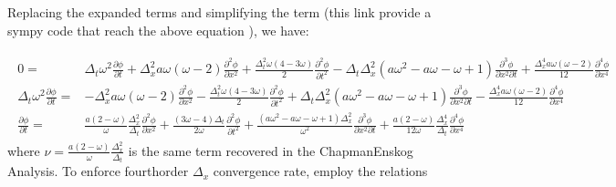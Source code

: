\documentclass[letterpaper,10pt,english,openany,oneside]{jupyterBook}
\begin{document}
\sphinxAtStartPar
Replacing the expanded terms and simplifying the term (this link provide a sympy code that reach the above equation ), we have:


\begin{equation}\label{equation:Refs/LBM-Study/FDM-Belloti/FDM-LBM-Diffusive:FDM-LBM-diff-replaced-expansions-phi}
\begin{split}
\begin{array}{rl}
0=&\Delta_{t} \omega^{2} \displaystyle\frac{\partial\phi}{\partial t} + \Delta_{x}^{2} a \omega \left(\omega - 2\right) \frac{\partial^{2}\phi}{\partial x^{2}}  + \frac{\Delta_{t}^{2} \omega \left(4 - 3 \omega\right) }{2} \frac{\partial^{2}\phi}{\partial t^{2}} - \Delta_{t} \Delta_{x}^{2} \left(a \omega^{2} - a \omega - \omega + 1\right) \frac{\partial^{3}\phi}{\partial x^{2}\partial t} + \frac{\Delta_{x}^{4} a \omega \left(\omega - 2\right) }{12}\frac{\partial^{4}\phi}{\partial x^{4}}\\
\Delta_{t} \omega^{2} \displaystyle\frac{\partial\phi}{\partial t} =& - \Delta_{x}^{2} a \omega \left(\omega - 2\right) \displaystyle\frac{\partial^{2}\phi}{\partial x^{2}}  - \frac{\Delta_{t}^{2} \omega \left(4 - 3 \omega\right) }{2} \frac{\partial^{2}\phi}{\partial t^{2}} + \Delta_{t} \Delta_{x}^{2} \left(a \omega^{2} - a \omega - \omega + 1\right) \frac{\partial^{3}\phi}{\partial x^{2}\partial t} - \frac{\Delta_{x}^{4} a \omega \left(\omega - 2\right) }{12}\frac{\partial^{4}\phi}{\partial x^{4}}\\
\displaystyle\frac{\partial\phi}{\partial t} =& \displaystyle\frac{a \left(2 - \omega \right)}{\omega} \frac{\Delta_{x}^{2}}{\Delta_{t}} \frac{\partial^{2}\phi}{\partial x^{2}}  + \frac{ \left(3 \omega - 4\right) \Delta_{t}}{2\omega} \frac{\partial^{2}\phi}{\partial t^{2}} + \frac{\left(a \omega^{2} - a \omega - \omega + 1\right)\Delta_{x}^{2}}{\omega^{2}} \frac{\partial^{3}\phi}{\partial x^{2}\partial t} + \frac{ a \left(2 - \omega\right) }{12\omega} \frac{\Delta_{x}^{4}}{\Delta_{t}} \frac{\partial^{4}\phi}{\partial x^{4}}
\end{array}
\end{split}
\end{equation}
\sphinxAtStartPar
where \(\nu=\frac{a \left(2 - \omega \right)}{\omega} \frac{\Delta_{x}^{2}}{\Delta_{t}}\) is the same term recovered in the Chapman\sphinxhyphen{}Enskog Analysis. To enforce fourth\sphinxhyphen{}order \(\Delta_{x}\) convergence rate, employ the relations
\end{document}

